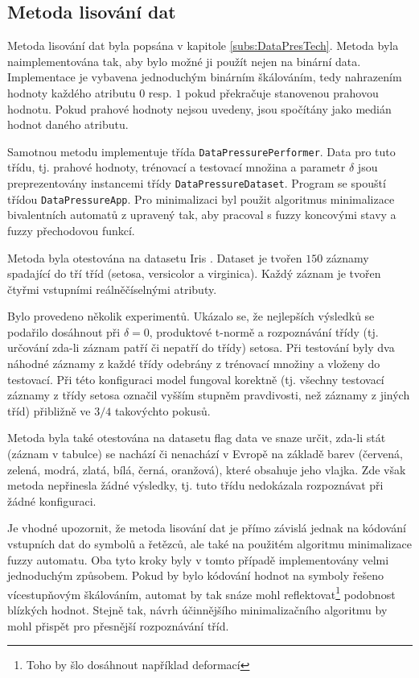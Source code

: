 \subsection{Metoda lisování dat} \label{subs:DataPresImpl}

Metoda lisování dat byla popsána v kapitole \ref{subs:DataPresTech}. Metoda byla naimplementována tak, aby bylo možné ji použít nejen na binární data. Implementace je vybavena jednoduchým binárním škálováním, tedy nahrazením hodnoty každého atributu $0$ resp. $1$ pokud překračuje stanovenou prahovou hodnotu. Pokud prahové hodnoty nejsou uvedeny, jsou spočítány jako medián hodnot daného atributu.

Samotnou metodu implementuje třída \verb|DataPressurePerformer|. Data pro tuto třídu, tj. prahové hodnoty, trénovací a testovací množina a parametr $\delta$ jsou preprezentovány instancemi třídy \verb|DataPressureDataset|. Program se spouští třídou \verb|DataPressureApp|. Pro minimalizaci byl použit algoritmus minimalizace bivalentních automatů z \cite{Koz-AutComp} upravený tak, aby pracoval s fuzzy koncovými stavy a fuzzy přechodovou funkcí.

Metoda byla otestována na datasetu Iris \cite{web-IrisDataset}. Dataset je tvořen $150$ záznamy spadající do tří tříd (setosa, versicolor a virginica). Každý záznam je tvořen čtyřmi vstupními reálněčíselnými atributy.

Bylo provedeno několik experimentů. Ukázalo se, že nejlepších výsledků se podařilo dosáhnout při $\delta = 0$, produktové t-normě a rozpoznávání třídy (tj. určování zda-li záznam patří či nepatří do třídy) setosa. Při testování byly dva náhodné záznamy z každé třídy odebrány z trénovací množiny a vloženy do testovací. Při této konfiguraci model fungoval korektně (tj. všechny testovací záznamy z třídy setosa označil vyšším stupněm pravdivosti, než záznamy z jiných tříd) přibližně ve $3/4$ takovýchto pokusů.

Metoda byla také otestována na datasetu flag data \cite{web-FlagsDataset} ve snaze určit, zda-li stát (záznam v tabulce) se nachází či nenachází v Evropě na základě barev (červená, zelená, modrá, zlatá, bílá, černá, oranžová), které obsahuje jeho vlajka. Zde však metoda nepřinesla žádné výsledky, tj. tuto třídu nedokázala rozpoznávat při žádné konfiguraci.

Je vhodné upozornit, že metoda lisování dat je přímo závislá jednak na kódování vstupních dat do symbolů a řetězců, ale také na použitém algoritmu minimalizace fuzzy automatu. Oba tyto kroky byly v tomto případě implementovány velmi jednoduchým způsobem. Pokud by bylo kódování hodnot na symboly řešeno vícestupňovým škálováním, automat by tak snáze mohl reflektovat\footnote{Toho by šlo dosáhnout například deformací } podobnost blízkých hodnot. Stejně tak, návrh účinnějšího minimalizačního algoritmu by mohl přispět pro přesnější rozpoznávání tříd.


